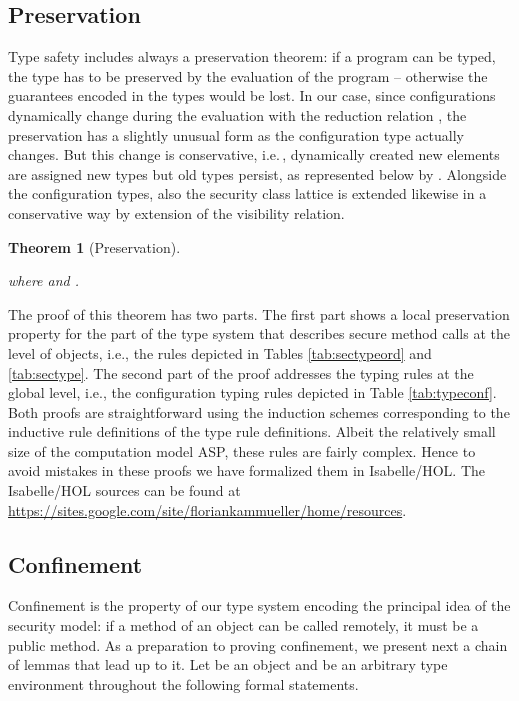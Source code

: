 \documentclass[10pt, conference, compsocconf]{IEEEtran}
\newcommand\aspfunp{ASP}
\newcommand\ie{i.e.\!\,, }
\newtheorem{theorem}{Theorem}
\begin{document}
{\subsection{Preservation}
Type safety includes always a preservation theorem: if a program can be typed,
the type has to be preserved by the evaluation of the program -- otherwise the guarantees
encoded in the types would be lost. In our case, since configurations dynamically change during the
evaluation with the reduction relation , the preservation has a slightly unusual form as the 
configuration type actually changes. But this change is conservative, \ie dynamically
created new elements are assigned new types but old types persist, as represented below 
by .
Alongside the configuration types, also the security class lattice is extended likewise
in a conservative way by extension of the visibility relation.

\begin{theorem}[Preservation]
\label{thm:subred}
\begin{small}

where  and .
\end{small}
\end{theorem}

The proof of this theorem has two parts. The first part shows a local preservation property
for the part of the type system that describes secure method calls at the level of objects, i.e.,
the rules depicted in Tables \ref{tab:sectypeord} and \ref{tab:sectype}. The second part of the proof
addresses the typing rules at the global level, i.e., the configuration typing rules depicted in 
Table \ref{tab:typeconf}. Both proofs are straightforward using the induction schemes corresponding to
the inductive rule definitions of the type rule definitions. Albeit the relatively small size of the 
computation model \aspfunp, these rules are fairly complex. Hence to avoid mistakes in these proofs we have 
formalized them in Isabelle/HOL. 
The Isabelle/HOL sources can be found at \url{https://sites.google.com/site/floriankammueller/home/resources}.

\subsection{Confinement}
\label{sec:conf}
Confinement is the property of our type system encoding the principal idea of
the security model: if a method of an object can be called remotely, it must be a
public  method.
As a preparation to proving confinement, we present next a chain of lemmas that lead up to it.
Let  be an object and  be an arbitrary type environment throughout the following formal
statements.



}
\end{document}
